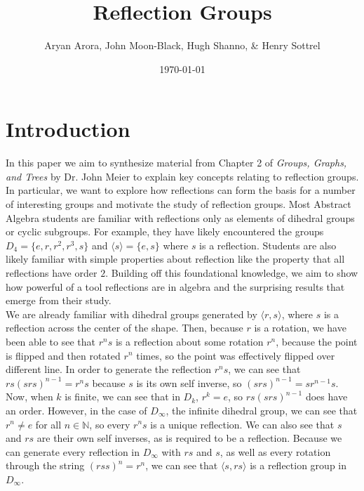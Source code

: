 \documentclass{article}
\title{Reflection Groups}
\author{Aryan Arora, John Moon-Black, Hugh Shanno, \& Henry Sottrel}
\date{\today}
\theoremstyle{definition}
\newcommand{\collaborators}[1]{\noindent\textit{For this problem set I collaborated with: #1}}
\newcommand{\resources}[1]{\noindent\textit{For this problem set I used the following books/websites: #1}}
\begin{document}
\maketitle





\section*{Introduction}

\noindent In this paper we aim to synthesize material from Chapter 2 of \emph{Groups, Graphs, and Trees} by Dr. John Meier to explain key concepts relating to reflection groups. In particular, we want to explore how reflections can form the basis for a number of interesting groups and motivate the study of reflection groups. Most Abstract Algebra students are familiar with reflections only as elements of dihedral groups or cyclic subgroups. For example, they have likely encountered the groups $D_4 = \{e, r, r^2, r^3, s\}$ and $\langle s \rangle = \{e, s\}$ where $s$ is a reflection. Students are also likely familiar with simple properties about reflection like the property that all reflections have order $2$. Building off this foundational knowledge, we aim to show how powerful of a tool reflections are in algebra and the surprising results that emerge from their study. \\

\noindent We are already familiar with dihedral groups generated by $\langle r,s \rangle$, where $s$ is a reflection across the center of the shape. Then, because $r$ is a rotation, we have been able to see that $r^n s$ is a reflection about some rotation $r^n$, because the point is flipped and then rotated $r^n$ times, so the point was effectively flipped over different line. In order to generate the reflection $r^n s$, we can see that $rs (s rs)^{n-1} = r^n s$ because $s$ is its own self inverse, so $(s rs)^{n-1} = sr^{n-1}s$. Now, when $k$ is finite, we can see that in $D_k$, $r^k = e$, so $rs (s rs)^{n-1}$ does have an order. However, in the case of $D_\infty$, the infinite dihedral group, we can see that $r^n \neq e$ for all $n \in \mathbb{N}$, so every $r^n s$ is a unique reflection. We can also see that $s$ and $rs$ are their own self inverses, as is required to be a reflection. Because we can generate every reflection in $D_\infty$ with $rs$ and $s$, as well as every rotation through the string $(rs s)^n = r^n$, we can see that $\langle s, rs \rangle$ is a reflection group in $D_\infty$.
\end{document}
